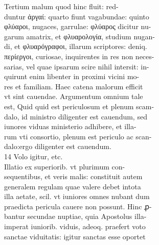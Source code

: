 \documentclass{article}
\begin{document}
\begin{pages}
                Tertium malum quod hinc fluit: red- \\
                duntur ἀργαί: quarto fiunt vagabundae: quinto \\
                φλύαροι, nugaces, garrulae: φλύαρος dicitur nu- \\
                garum amatrix, et φλυαρολογία, studium nugan- \\
                di, et φλυαρόγραφοι, illarum scriptores: deniq. \\
                περίεργοι, curiosae, inquirentes in res non neces- \\
                sarias, vel quae ipsarum scire nihil intersit: in- \\
                quirunt enim libenter in proximi vicini mo- \\
                res et familiam. Haec catena malorum efficit \\
                vt sint cauendae. Argumentum omnium tale \\
                est, Quid quid est periculosum et plenum scam- \\
                dalo, id ministro diligenter est cauendum, sed \\
                iunores viduas ministerio adhibere, et illa- \\
                rum vti consortio, plenum est periculo ac scan- \\
                dalo:ergo diligenter est cauendum. \\
                14 Volo igitur, etc. \\
                Illatio ex superiorib. vt plurimum con- \\
                sequentibus, et veris malis: constituit autem \\
                generalem regulam quae valere debet intota \\
                illa aetate, scil. vt iuniores omnes nubant dum \\
                praedicta pericula cauere non possunt. Hinc ꝓ- \\
                bantur secundae nuptiae, quia Apostolus illa- \\
                imperat iuniorib. viduis, adeoq. praefert voto \\
                sanctae viduitatis: igitur sanctas esse oportet \\

\end{pages}
\end{document}
